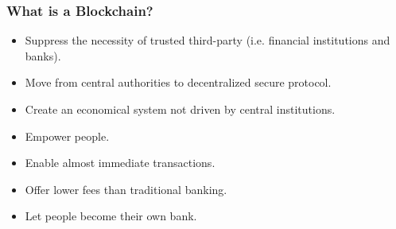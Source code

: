\documentclass[notitlepage, usenames,dvipsnames]{beamer}
\newcommand{\st}{\structure}
\begin{document}
    \begin{frame}
        \frametitle{What is a Blockchain?}

        \begin{overlayarea}{\textwidth}{\textheight}

            \vspace{4ex}

             {
            }

             {
            \vspace{4ex}
            \begin{itemize}
                \item \alert{Suppress} the necessity of trusted third-party (i.e. financial institutions and banks).
                \item Move \st{trust} from central authorities to decentralized secure protocol.
                \item Create an economical system not driven by central institutions.
                \item \alert{Empower} people.
                \item Enable almost \alert{immediate} transactions.
                \item Offer \alert{lower fees} than traditional banking.
                \item Let people become their own bank.
            \end{itemize}

            }

        \end{overlayarea}
    \end{frame}
\end{document}
